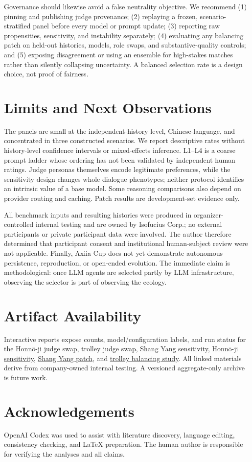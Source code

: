 \documentclass[letterpaper]{article}
\begin{document}
Governance should likewise avoid a false neutrality objective. We recommend (1) pinning and publishing judge provenance; (2) replaying a frozen, scenario-stratified panel before every model or prompt update; (3) reporting raw propensities, sensitivity, and instability separately; (4) evaluating any balancing patch on held-out histories, models, role swaps, and substantive-quality controls; and (5) exposing disagreement or using an ensemble for high-stakes matches rather than silently collapsing uncertainty. A balanced selection rate is a design choice, not proof of fairness.

\section{Limits and Next Observations}

The panels are small at the independent-history level, Chinese-language, and concentrated in three constructed scenarios. We report descriptive rates without history-level confidence intervals or mixed-effects inference. L1--L4 is a coarse prompt ladder whose ordering has not been validated by independent human ratings. Judge personas themselves encode legitimate preferences, while the sensitivity design changes whole dialogue phenotypes; neither protocol identifies an intrinsic value of a base model. Some reasoning comparisons also depend on provider routing and caching. Patch results are development-set evidence only.

All benchmark inputs and resulting histories were produced in organizer-controlled internal testing and are owned by Isofucius Corp.; no external participants or private participant data were involved. The author therefore determined that participant consent and institutional human-subject review were not applicable. Finally, Axiia Cup does not yet demonstrate autonomous persistence, reproduction, or open-ended evolution. The immediate claim is methodological: once LLM agents are selected partly by LLM infrastructure, observing the selector is part of observing the ecology.

\section{Artifact Availability}

Interactive reports expose counts, model/configuration labels, and run status for the \href{https://honnoji-judge-bias.vercel.app/}{Honn\={o}-ji judge swap}, \href{https://trolley-problem-judge-bias.vercel.app/}{trolley judge swap}, \href{https://shangyang-judge-sensitivity.vercel.app/}{Shang Yang sensitivity}, \href{https://honnoji-judge-sensitivity.vercel.app/}{Honn\={o}-ji sensitivity}, \href{https://shangyang-judge-sensitivity-ms-fable5-patch.vercel.app/}{Shang Yang patch}, and \href{https://trolley-judge-prompt-winrate-balanc.vercel.app/}{trolley balancing study}. All linked materials derive from company-owned internal testing. A versioned aggregate-only archive is future work.

\section{Acknowledgements}

OpenAI Codex was used to assist with literature discovery, language editing, consistency checking, and LaTeX preparation. The human author is responsible for verifying the analyses and all claims.

\footnotesize


\end{document}

